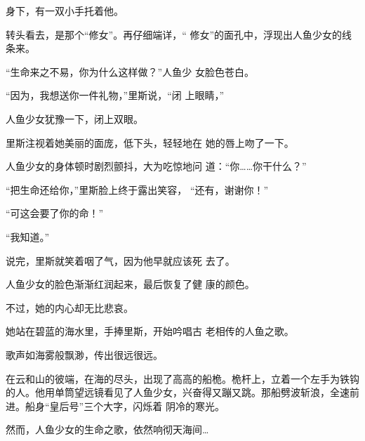 \documentclass{article}
\begin{document}
身下，有一双小手托着他。 

转头看去，是那个“修女”。再仔细端详，“
修女”的面孔中，浮现出人鱼少女的线条来。 

“生命来之不易，你为什么这样做？”人鱼少
女脸色苍白。 

“因为，我想送你一件礼物，”里斯说，“闭
上眼睛，” 


人鱼少女犹豫一下，闭上双眼。 

\newpage

里斯注视着她美丽的面庞，低下头，轻轻地在
她的唇上吻了一下。 

人鱼少女的身体顿时剧烈颤抖，大为吃惊地问
道：“你……你干什么？” 

“把生命还给你，”里斯脸上终于露出笑容，
“还有，谢谢你！” 


“可这会要了你的命！” 


“我知道。” 

说完，里斯就笑着咽了气，因为他早就应该死
去了。 

人鱼少女的脸色渐渐红润起来，最后恢复了健
康的颜色。 


不过，她的内心却无比悲哀。 

\newpage

她站在碧蓝的海水里，手捧里斯，开始吟唱古
老相传的人鱼之歌。 


歌声如海雾般飘渺，传出很远很远。 

在云和山的彼端，在海的尽头，出现了高高的船桅。桅杆上，立着一个左手为铁钩的人。他用单筒望远镜看见了人鱼少女，兴奋得又蹦又跳。那船劈波斩浪，全速前进。船身“皇后号”三个大字，闪烁着
阴冷的寒光。 

然而，人鱼少女的生命之歌，依然响彻天海间…
\end{document}
